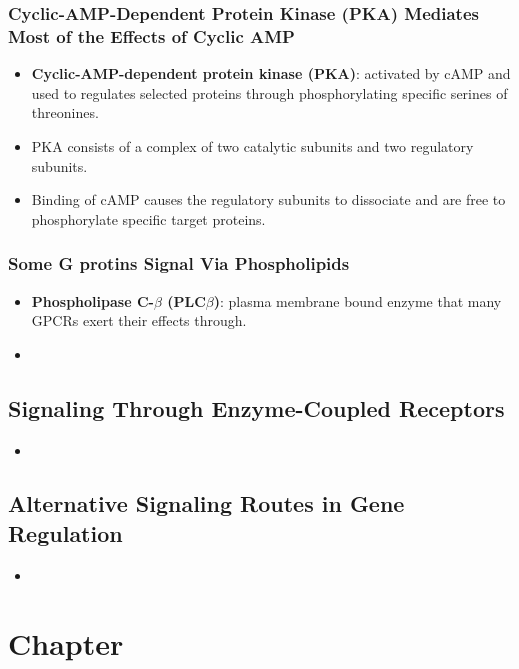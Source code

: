 \documentclass[12pt,a4paper]{article}
\begin{document}
\subsubsection{Cyclic-AMP-Dependent Protein Kinase (PKA) Mediates Most of the Effects of Cyclic AMP}
\begin{itemize}
    \item \textbf{Cyclic-AMP-dependent protein kinase (PKA)}: activated by cAMP and used to regulates selected proteins through phosphorylating specific serines of threonines.
    \item PKA consists of a complex of two catalytic subunits and two regulatory subunits.
    \item Binding of cAMP causes the regulatory subunits to dissociate and are free to phosphorylate specific target proteins.
\end{itemize}

\subsubsection{Some G protins Signal Via Phospholipids}
\begin{itemize}
    \item \textbf{Phospholipase C-$\beta$ (PLC$\beta$)}: plasma membrane bound enzyme that many GPCRs exert their effects through.
    \item 
\end{itemize}
\subsection{Signaling Through Enzyme-Coupled Receptors}
\begin{itemize}
    \item 
\end{itemize}

\subsection{Alternative Signaling Routes in Gene Regulation}
\begin{itemize}
    \item 
\end{itemize}

\clearpage
\section{Chapter}
\end{document}
